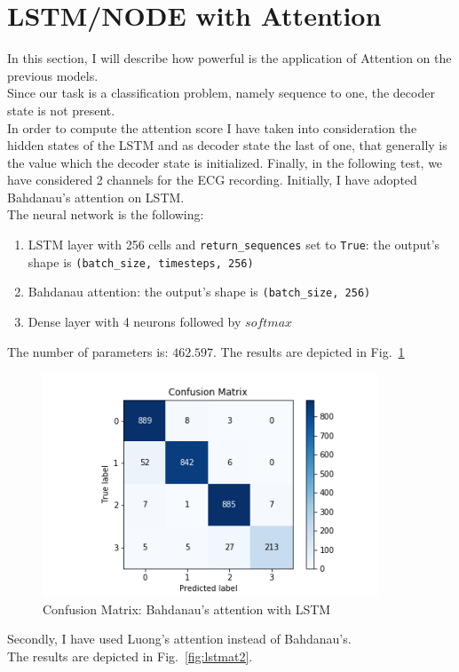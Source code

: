 \documentclass[LaM,binding=0.6cm]{sapthesis}
\begin{document}
\section{LSTM/NODE with Attention}
In this section, I will describe how powerful is the application of Attention on the previous models.\\Since our task is a classification problem, namely sequence to one, the decoder state is not present.\\In order to compute the attention score I have taken into consideration the hidden states of the LSTM and as decoder state the last of one, that generally is the value which the decoder state is initialized. Finally, in the following test, we have considered 2 channels for the ECG recording.
Initially, I have adopted Bahdanau's attention on LSTM.\\The neural network is the following:
\begin{enumerate}
\item LSTM layer with 256 cells and \texttt{return\_sequences} set to \texttt{True}: the output's shape is \texttt{(batch\_size, timesteps, 256)} 
\item Bahdanau attention: the output's shape is \texttt{(batch\_size, 256)} 
\item Dense layer with 4 neurons followed by $softmax$
\end{enumerate}
The number of parameters is: $462.597$.
The results are depicted in Fig.~\ref{fig:lstmat1}
\begin{figure}[H]  \centering
    \includegraphics[width=100mm,scale=0.7]{lstmat1}
    \caption{Confusion Matrix: Bahdanau's attention with LSTM}
    \label{fig:lstmat1}
\end{figure}
Secondly, I have used Luong's attention instead of Bahdanau's.\\The results are depicted in Fig.~\ref{fig:lstmat2}.
\end{document}
